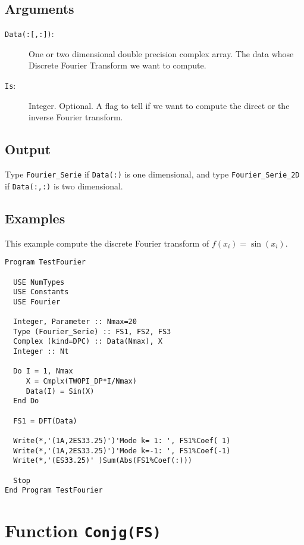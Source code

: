 \subsection{Arguments}

\begin{description}
\item[\texttt{Data(:[,:])}:] One or two dimensional double precision complex
  array. The data whose Discrete Fourier Transform we want to
  compute.
\item[\texttt{Is}:] Integer. Optional. A flag to tell if we want to
  compute the direct or the inverse Fourier transform.
\end{description}

\subsection{Output}

Type \texttt{Fourier\_Serie} if \texttt{Data(:)} is one dimensional,
and type \texttt{Fourier\_Serie\_2D} if \texttt{Data(:,:)} is two
dimensional. 

\subsection{Examples}

This example compute the discrete Fourier transform of $f(x_i) =
\sin(x_i)$. 

\begin{lstlisting}[emph=DFT,
                   emphstyle=\color{blue},
                   frame=trBL,
                   caption=Computing the Discrete Fourier Transform.,
                   label=dft]
Program TestFourier

  USE NumTypes
  USE Constants
  USE Fourier

  Integer, Parameter :: Nmax=20
  Type (Fourier_Serie) :: FS1, FS2, FS3
  Complex (kind=DPC) :: Data(Nmax), X
  Integer :: Nt

  Do I = 1, Nmax
     X = Cmplx(TWOPI_DP*I/Nmax)
     Data(I) = Sin(X)
  End Do

  FS1 = DFT(Data)

  Write(*,'(1A,2ES33.25)')'Mode k= 1: ', FS1%Coef( 1)
  Write(*,'(1A,2ES33.25)')'Mode k=-1: ', FS1%Coef(-1)
  Write(*,'(ES33.25)' )Sum(Abs(FS1%Coef(:)))

  Stop
End Program TestFourier
\end{lstlisting}

\section{Function \texttt{Conjg(FS)}}

